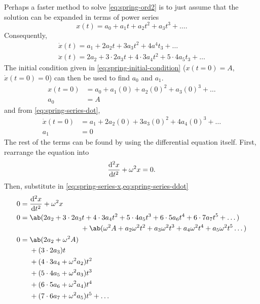 Perhaps a faster method to solve \cref{eq:spring-ord2} is to just assume that the solution can be expanded in terms of power series
\begin{equation}
  x(t) = a_0 + a_1t + a_2t^2 + a_3t^3 + \dots. \label{eq:spring-series-x}
\end{equation}
Consequently,
\begin{gather}
  \dot{x}(t) = a_1 + 2a_2t + 3a_3t^2 + 4a^4t_3 + \dots \label{eq:spring-series-dot} \\
  \ddot{x}(t) = 2a_2 + 3\cdot 2a_3t + 4\cdot 3a_4t^2 + 5\cdot 4a_5t_3 + \dots \label{eq:spring-series-ddot}
\end{gather}
The initial condition given in \cref{eq:spring-initial-condition} (\(x(t = 0) = A\), \(\dot{x}(t = 0) = 0\)) can then be used to find \(a_0\) and \(a_1\).
\begin{align}
  x(t = 0) & = a_0 + a_1(0) + a_2(0)^2 + a_3(0)^3 + \dots \\
  a_0      & = A
\end{align}
and from \cref{eq:spring-series-dot},
\begin{align}
  \dot{x}(t = 0) & = a_1 + 2a_2(0) + 3a_3(0)^2 + 4a_4(0)^3 + \dots \\
  a_1            & = 0
\end{align}
The rest of the terms can be found by using the differential equation itself. First, rearrange the equation into
\begin{equation}
  \odv[ord = 2]{x}{t} + \omega^2x = 0.
\end{equation}
Then, substitute in \cref{eq:spring-series-x,eq:spring-series-ddot}
\begin{align}
  0 & = \odv[ord = 2]{x}{t} + \omega^2x                                                                      \\
  0 & = \begin{multlined}[t]
          \ab(2a_2 + 3\cdot 2a_3t + 4\cdot 3a_4t^2 + 5\cdot 4a_5t^3 + 6\cdot 5a_6t^4 + 6\cdot 7a_7t^5 + \dots) \\
          + \ab(\omega^2A + a_2\omega^2t^2 + a_3\omega^2t^3 + a_4\omega^2t^4 + a_5\omega^2t^5\dots) \nonumber
        \end{multlined} \\
  0 & = \begin{aligned}[t]
           & \ab(2a_2 + \omega^2A)                   \\
           & +(3 \cdot 2a_3)t                        \\
           & +(4\cdot 3a_4 + \omega^2a_2)t^2         \\
           & +(5\cdot 4a_5 + \omega^2a_3)t^3         \\
           & +(6\cdot 5a_6 + \omega^2a_4)t^4         \\
           & +(7\cdot 6a_7 + \omega^2a_5)t^5 + \dots \\
        \end{aligned}
\end{align}

